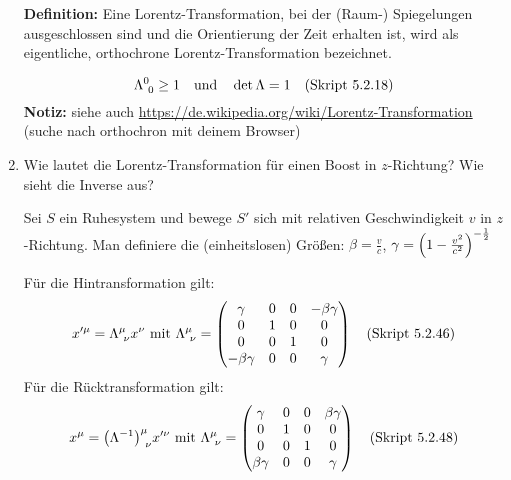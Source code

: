 \begin{enumerate}
    \textbf{Definition:} Eine Lorentz-Transformation, bei der (Raum-) 
    Spiegelungen 
    ausgeschlossen sind und die Orientierung der Zeit erhalten ist, 
    wird als eigentliche, orthochrone Lorentz-Transformation bezeichnet.

    \begin{equation*}
      \Lambda^{0}_{\ 0} \ge 1 
      \quad \text{und}\quad
      \det \Lambda = 1 \quad\text{(Skript 5.2.18)}
    \end{equation*}
    \textbf{Notiz:} siehe auch 
    \url{https://de.wikipedia.org/wiki/Lorentz-Transformation} (suche 
    nach orthochron mit deinem Browser)

  \item Wie lautet die Lorentz-Transformation für einen Boost in 
    $z$-Richtung? Wie sieht die Inverse aus?
    
    Sei $S$ ein Ruhesystem und bewege $S'$ sich mit relativen 
    Geschwindigkeit $v$ in $z$-Richtung. Man definiere die (einheitslosen)
    Größen:
    $\beta = \frac{v}{c}$, $\gamma=\qty(1-\frac{v^2}{c^2})^{-\frac{1}{2}}$
    
    Für die Hintransformation gilt:
    \begin{equation*}
      x'^\mu = \Lambda^\mu_{\ \nu} x^\nu 
      \text{ mit } 
      \Lambda^\mu_{\ \nu}=
      \begin{pmatrix}
        \gamma       & 0 & 0 & -\beta\gamma\\
        0            & 1 & 0 & 0           \\
        0            & 0 & 1 & 0           \\
        -\beta\gamma & 0 & 0 & \gamma      \\
      \end{pmatrix}
      \quad\text{(Skript 5.2.46)}
    \end{equation*}
    Für die Rücktransformation gilt:
    \begin{equation*}
      x^\mu = \qty(\Lambda^{-1})^\mu_{\ \nu} x'^\nu 
      \text{ mit } 
      \Lambda^\mu_{\ \nu}=
      \begin{pmatrix}
        \gamma       & 0 & 0 & \beta\gamma\\
        0            & 1 & 0 & 0           \\
        0            & 0 & 1 & 0           \\
        \beta\gamma  & 0 & 0 & \gamma      \\
      \end{pmatrix}
      \quad\text{(Skript 5.2.48)}
    \end{equation*}


\end{enumerate}
